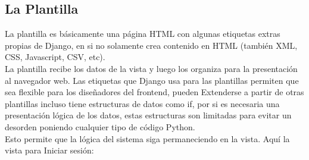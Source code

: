 \subsection{La Plantilla}

La plantilla es básicamente una página HTML con algunas etiquetas extras propias de Django, en si no solamente crea contenido en HTML (también XML, CSS, Javascript, CSV, etc).\\[0.1cm]

La plantilla recibe los datos de la vista y luego los organiza para la presentación al navegador web. Las etiquetas que Django usa para las plantillas permiten que sea flexible para los diseñadores del frontend, pueden Extenderse a partir de otras plantillas incluso tiene estructuras de datos como if, por si es necesaria una presentación lógica de los datos, estas estructuras son limitadas para evitar un desorden poniendo cualquier tipo de código Python.\\[0.1cm]

Esto permite que la lógica del sistema siga permaneciendo en la vista. Aquí la vista para Iniciar sesión:\\[0.1cm]

